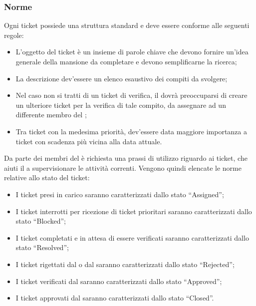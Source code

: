 \subsubsection{Norme}
\label{regoleGenerali}
Ogni ticket possiede una struttura standard e deve essere conforme alle seguenti regole:
\begin{itemize}
\item L'oggetto del ticket è un insieme di parole chiave che devono fornire un'idea generale della mansione da completare e devono semplificarne la ricerca;
\item La descrizione dev'essere un elenco esaustivo dei compiti da svolgere;
\item Nel caso non si tratti di un ticket di verifica, il \rRP dovrà preoccuparsi di creare un ulteriore ticket per la verifica di tale compito, da assegnare ad un differente membro del ;
\item Tra ticket con la medesima priorità, dev'essere data maggiore importanza a ticket con scadenza più vicina alla data attuale.
\end{itemize}
Da parte dei membri del  è richiesta una prassi di utilizzo riguardo ai ticket, che aiuti il \rRP a supervisionare le attività correnti.
Vengono quindi elencate le norme relative allo stato del ticket:
\begin{itemize}
\item I ticket presi in carico saranno caratterizzati dallo stato ``Assigned'';
\item I ticket interrotti per ricezione di ticket prioritari saranno caratterizzati dallo stato ``Blocked'';
\item I ticket completati e in attesa di essere verificati saranno caratterizzati dallo stato ``Resolved'';
\item I ticket rigettati dal \rV o dal \rRP saranno caratterizzati dallo stato ``Rejected'';
\item I ticket verificati dal \rV saranno caratterizzati dallo stato ``Approved'';
\item I ticket approvati dal \rRP saranno caratterizzati dallo stato ``Closed''.
\end{itemize}
